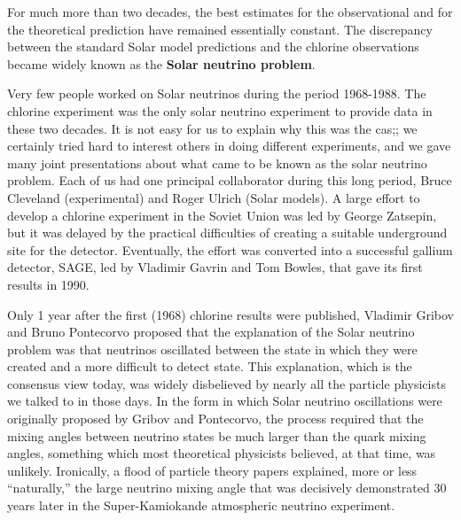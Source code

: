 \documentclass[a4paper,10pt]{article}
\begin{document}
{\noindent}For much more than two decades, the best estimates for the observational and for the theoretical prediction have remained essentially constant. The discrepancy between the standard Solar model predictions and the chlorine observations became widely known as the \textbf{Solar neutrino problem}. 

{\noindent}Very few people worked on Solar neutrinos during the period 1968-1988. The chlorine experiment was the only solar neutrino experiment to provide data in these two decades. It is not easy for us to explain why this was the cas;; we certainly tried hard to interest others in doing different experiments, and we gave many joint presentations about what came to be known as the solar neutrino problem. Each of us had one principal collaborator during this long period, Bruce Cleveland (experimental) and Roger Ulrich (Solar models). A large effort to develop a chlorine experiment in the Soviet Union was led by George Zatsepin, but it was delayed by the practical difficulties of creating a suitable underground site for the detector. Eventually, the effort was converted into a successful gallium detector, SAGE, led by Vladimir Gavrin and Tom Bowles, that gave its first results in 1990.

{\noindent}Only 1 year after the first (1968) chlorine results were published, Vladimir Gribov and Bruno Pontecorvo proposed that the explanation of the Solar neutrino problem was that neutrinos oscillated between the state in which they were created and a more difficult to detect state. This explanation, which is the consensus view today, was widely disbelieved by nearly all the particle physicists we talked to in those days. In the form in which Solar neutrino oscillations were originally proposed by Gribov and Pontecorvo, the process required that the mixing angles between neutrino states be much larger than the quark mixing angles, something which most theoretical physicists believed, at that time, was unlikely. Ironically, a flood of particle theory papers explained, more or less ``naturally,'' the large neutrino mixing angle that was decisively demonstrated 30 years later in the Super-Kamiokande atmospheric neutrino experiment.
\end{document}
